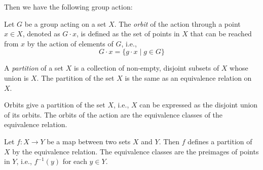 \documentclass[
	11pt, %
	fleqn, %
	a4paper, %
]{LegrandOrangeBook}
\begin{document}
Then we have the following group action:
\begin{center}
\end{center}

\begin{definition}[Orbits]
    Let $G$ be a group acting on a set $X$. The \emph{orbit} of the action through a point $x \in X$, denoted as $G \cdot x$, is defined as the set of points in $X$ that can be reached from $x$ by the action of elements of $G$, i.e., 
    \[
        G \cdot x = \{g \cdot x \mid g \in G\}
    \]
\end{definition}

\begin{definition}[Partition]
    A \emph{partition} of a set $X$ is a collection of non-empty, disjoint subsets of $X$ whose union is $X$. The partition of the set $X$ is the same as an equivalence relation on $X$.
\end{definition}

\begin{proposition}
    Orbits give a partition of the set $X$, i.e., $X$ can be expressed as the disjoint union of its orbits. The orbits of the action are the equivalence classes of the equivalence relation.
\end{proposition}

\begin{proposition}
    Let $f : X \to Y$ be a map between two sets $X$ and $Y$. Then $f$ defines a partition of $X$ by the equivalence relation. The equivalence classes are the preimages of points in $Y$, i.e., $f^{-1}(y)$ for each $y \in Y$.
\end{proposition}
\end{document}

